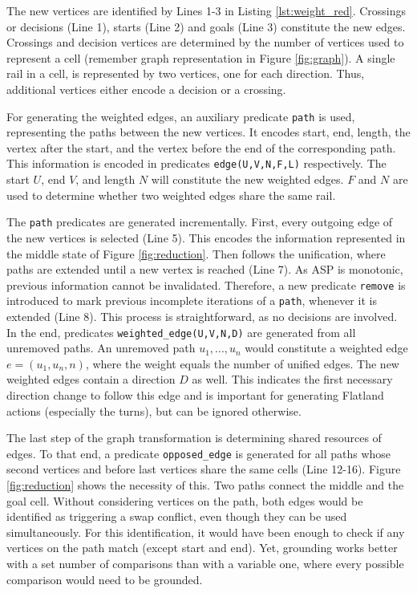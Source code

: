 \documentclass{llncs}
\begin{document}
\begin{multicols*}{2}
The new vertices are identified by Lines 1-3 in Listing \ref{lst:weight_red}. Crossings or decisions (Line 1), starts (Line 2) and goals (Line 3) constitute the new edges. Crossings and decision vertices are determined by the number of vertices used to represent a cell (remember graph representation in Figure \ref{fig:graph}). A single rail in a cell, is represented by two vertices, one for each direction. Thus, additional vertices either encode a decision or a crossing.

For generating the weighted edges, an auxiliary predicate \texttt{path} is used, representing the paths between the new vertices. It encodes start, end, length, the vertex after the start, and the vertex before the end of the corresponding path. This information is encoded in predicates \texttt{edge(U,V,N,F,L)} respectively. The start $U$, end $V$, and length $N$ will constitute the new weighted edges. $F$ and $N$ are used to determine whether two weighted edges share the same rail.

The \texttt{path} predicates are generated incrementally. First, every outgoing edge of the new vertices is selected (Line 5). This encodes the information represented in the middle state of Figure \ref{fig:reduction}. Then follows the unification, where paths are extended until a new vertex is reached (Line 7). As ASP is monotonic, previous information cannot be invalidated. Therefore, a new predicate \texttt{remove} is introduced to mark previous incomplete iterations of a \texttt{path}, whenever it is extended (Line 8). This process is straightforward, as no decisions are involved. In the end, predicates \texttt{weighted\_edge(U,V,N,D)} are generated from all unremoved paths. An unremoved path $u_1,...,u_n$ would constitute a weighted edge $e = (u_1,u_n,n)$, where the weight equals the number of unified edges. The new weighted edges contain a direction $D$ as well. This indicates the first necessary direction change to follow this edge and is important for generating Flatland actions (especially the turns), but can be ignored otherwise.

The last step of the graph transformation is determining shared resources of edges. To that end, a predicate \texttt{opposed\_edge} is generated for all paths whose second vertices and before last vertices share the same cells (Line 12-16). Figure \ref{fig:reduction} shows the necessity of this. Two paths connect the middle and the goal cell. Without considering vertices on the path, both edges would be identified as triggering a swap conflict, even though they can be used simultaneously. For this identification, it would have been enough to check if any vertices on the path match (except start and end). Yet, grounding works better with a set number of comparisons than with a variable one, where every possible comparison would need to be grounded.\\


\end{multicols*}
\end{document}
